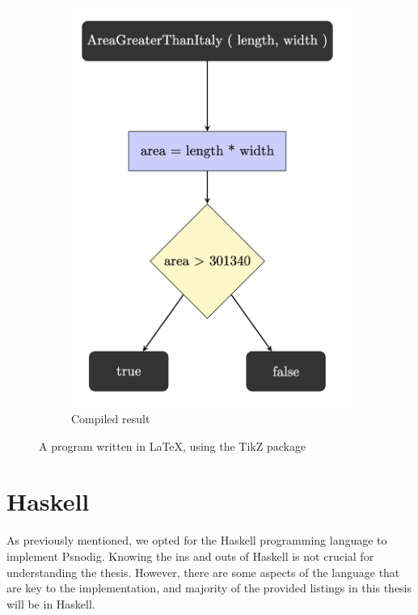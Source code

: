 \begin{figure}[ht]
\begin{subfigure}{.3\linewidth}
  \includegraphics[width=\textwidth]{assets/AGTI_IBP.png}
  \caption{Compiled result}
  \label{fig:AGTI_IBP_result}
\end{subfigure}
\caption{A program written in LaTeX, using the TikZ package}
\label{fig:AGTI_IBP}
\end{figure}

\section{Haskell}

As previously mentioned, we opted for the Haskell programming language to implement Psnodig. Knowing the ins and outs of Haskell is not crucial for understanding the thesis. However, there are some aspects of the language that are key to the implementation, and majority of the provided listings in this thesis will be in Haskell.

